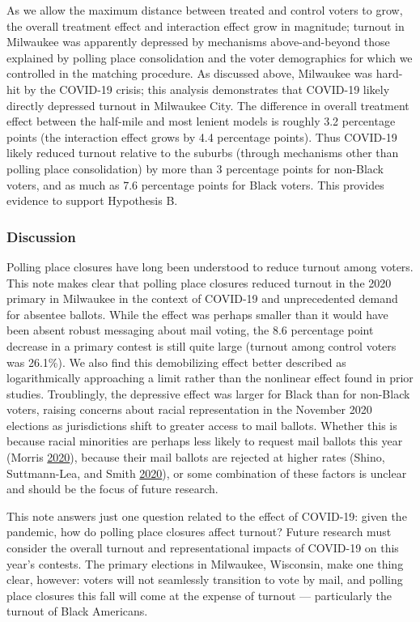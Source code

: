\documentclass[
  12pt,
]{article}
\begin{document}
As we allow the maximum distance between treated and control voters to grow, the overall treatment effect and interaction effect grow in magnitude; turnout in Milwaukee was apparently depressed by mechanisms above-and-beyond those explained by polling place consolidation and the voter demographics for which we controlled in the matching procedure. As discussed above, Milwaukee was hard-hit by the COVID-19 crisis; this analysis demonstrates that COVID-19 likely directly depressed turnout in Milwaukee City. The difference in overall treatment effect between the half-mile and most lenient models is roughly 3.2 percentage points (the interaction effect grows by 4.4 percentage points). Thus COVID-19 likely reduced turnout relative to the suburbs (through mechanisms other than polling place consolidation) by more than 3 percentage points for non-Black voters, and as much as 7.6 percentage points for Black voters. This provides evidence to support Hypothesis B.

\hypertarget{discussion}{%
\subsubsection*{Discussion}\label{discussion}}

Polling place closures have long been understood to reduce turnout among voters. This note makes clear that polling place closures reduced turnout in the 2020 primary in Milwaukee in the context of COVID-19 and unprecedented demand for absentee ballots. While the effect was perhaps smaller than it would have been absent robust messaging about mail voting, the 8.6 percentage point decrease in a primary contest is still quite large (turnout among control voters was 26.1\%). We also find this demobilizing effect better described as logarithmically approaching a limit rather than the nonlinear effect found in prior studies. Troublingly, the depressive effect was larger for Black than for non-Black voters, raising concerns about racial representation in the November 2020 elections as jurisdictions shift to greater access to mail ballots. Whether this is because racial minorities are perhaps less likely to request mail ballots this year (Morris \protect\hyperlink{ref-Morris2020}{2020}), because their mail ballots are rejected at higher rates (Shino, Suttmann-Lea, and Smith \protect\hyperlink{ref-Shino2020}{2020}), or some combination of these factors is unclear and should be the focus of future research.

This note answers just one question related to the effect of COVID-19: given the pandemic, how do polling place closures affect turnout? Future research must consider the overall turnout and representational impacts of COVID-19 on this year's contests. The primary elections in Milwaukee, Wisconsin, make one thing clear, however: voters will not seamlessly transition to vote by mail, and polling place closures this fall will come at the expense of turnout --- particularly the turnout of Black Americans.
\end{document}
